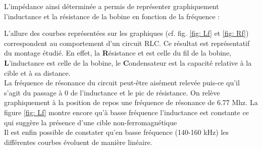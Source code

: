 L'impédance ainsi déterminée a permis de représenter graphiquement l'inductance et la résistance de 
la bobine en fonction de la fréquence :



L'allure des courbes représentées sur les graphiques (cf. fig. \ref{fig: Lf} et \ref{fig: Rf})
correspondent au comportement d'un circuit RLC. Ce résultat est représentatif du montage étudié.
En effet, la \textbf{R}ésistance et est celle du fil de la bobine, \textbf{L}'inductance est celle 
de la bobine, le \textbf{C}ondensateur est la capacité relative à la 
cible et à sa distance.\\

La fréquence de résonance du circuit peut-être aisément relevée puis-ce qu'il s'agit du passage à 0 
de l'inductance et le pic de résistance. On relève graphiquement à la 
position de repos une fréquence de résonance de 6.77 Mhz. La figure \ref{fig: Lf} montre encore
qu'à basse fréquence l'inductance est constante ce qui suggère la présence d'une cible non-ferromagnétique\\





Il est enfin possible de constater qu'en basse fréquence (140-160 kHz) les différentes courbes évoluent
de manière linéaire. \\





